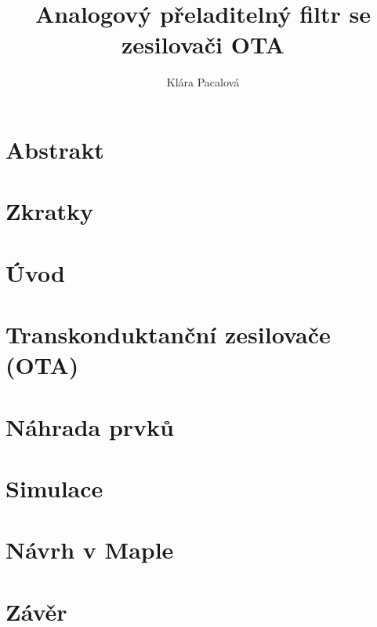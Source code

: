 \documentclass[twoside]{article}
\newcommand{\sekce}[1]{\clearpage \section{#1}}
\newcommand{\nadpis}[1]{\newpage \section*{#1}}
\begin{document}
\title{Analogový přeladitelný filtr se zesilovači OTA}
\author{Klára Pacalová}


\fancyhf[HC]{\bfseries\leftmark}


\thispagestyle{empty} 
\nadpis{}

\thispagestyle{empty} 
\nadpis{}

\thispagestyle{empty} 
\nadpis{Abstrakt}

\renewcommand{\headrulewidth}{0.5pt}

\nadpis{Zkratky}


{
\hypersetup{hidelinks}
\newpage
\tableofcontents
\newpage
\listoffigures
\newpage
\listoftables
}

\sekce{Úvod}

\sekce{Transkonduktanční zesilovače (OTA)}

\sekce{Náhrada prvků}\label{s:NAH}

\sekce{Simulace}

\sekce{Návrh v Maple}\label{s:MAPLE}

\sekce{Závěr}


\renewcommand{\headrulewidth}{0pt}
\fancyhf{}
\end{document}
